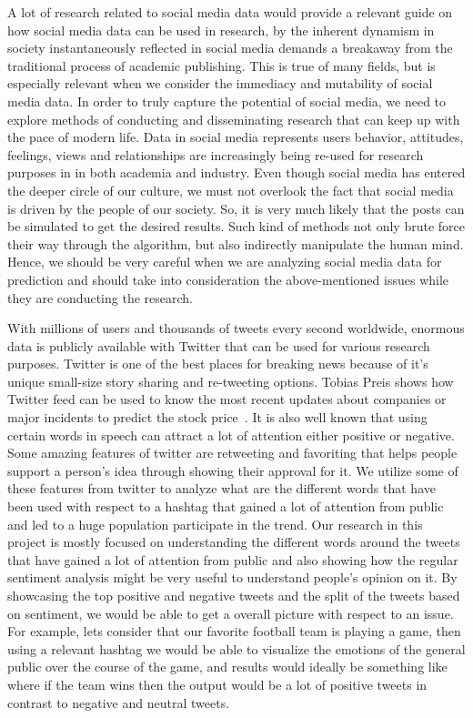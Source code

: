 A lot of research related to social media data would provide a relevant guide on how 
social media data can be used in research, by the inherent dynamism in society 
instantaneously reflected in social media demands a breakaway from the traditional 
process of academic publishing. This is true of many fields, but is especially relevant 
when we consider the immediacy and mutability of social media data. In order to 
truly capture the potential of social media, we need to explore methods of conducting 
and disseminating research that can keep up with the pace of modern life. Data in 
social media represents users behavior, attitudes, feelings, views and relationships are
increasingly being re-used for research purposes in in both academia and industry. 
Even though social media has entered the deeper circle of our culture, we must 
not overlook the fact that social media is driven by the people of our society. 
So, it is very much likely that the posts can be simulated to get the desired 
results. Such kind of methods not only brute force their way through the 
algorithm, but also indirectly manipulate the human mind. Hence, we
should be very careful when we are analyzing social media data for prediction 
and should take into consideration the above-mentioned issues while they are 
conducting the research.

With millions of users and thousands of tweets every second worldwide, enormous 
data is publicly available with Twitter that can be used for various research purposes. 
Twitter is one of the best places for breaking news because of it’s unique 
small-size story sharing and re-tweeting options. Tobias Preis shows how 
Twitter feed can be used to know the most recent updates about companies or 
major incidents to predict the stock price~\cite{hid-sp18-418-effect-twitter}. 
It is also well known that using certain words in speech can attract a lot of attention 
either positive or negative. Some amazing features of twitter are retweeting and 
favoriting that helps people support a person’s idea through showing their 
approval for it. We utilize some of these features from twitter to analyze what are the 
different words that have been used with respect to a hashtag that gained a lot of 
attention from public and led to a huge population participate in the trend. 
Our research in this project is mostly focused on understanding the different 
words around the tweets that have gained a lot of attention from public and also 
showing how the regular sentiment analysis might be very useful to understand 
people’s opinion on it. By showcasing the top positive and negative tweets and 
the split of the tweets based on sentiment, we would be able to get a overall 
picture with respect to an issue. For example, lets consider that our favorite 
football team is playing a game, then using a relevant hashtag we would be able 
to visualize the emotions of the general public over the course of the game, and 
results would ideally be something like where if the team wins then the output 
would be a lot of positive tweets in contrast to negative and neutral tweets. 



